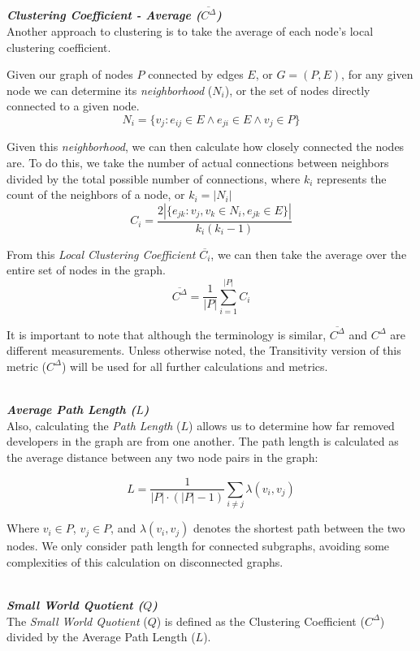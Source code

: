 \documentclass{proc}
\begin{document}
\noindent\\\textit{\textbf{Clustering Coefficient - Average ($\overline{C^\Delta}$)}}\\
Another approach to clustering is to take the average of each node's local clustering coefficient\cite{watts1998collective}.

Given our graph of nodes $P$ connected by edges $E$, or ${G=(P,E)}$, for any given node we can determine its \textit{neighborhood} ($N_i$), or the set of nodes directly connected to a given node.
\[ N_i = \{v_j : e_{ij} \in E \wedge e_{ji} \in E \wedge v_j \in P\} \]

Given this \textit{neighborhood}, we can then calculate how closely connected the nodes are. To do this, we take the number of actual connections between neighbors divided by the total possible number of connections, where $k_i$ represents the count of the neighbors of a node, or {$k_i = |N_i|$}
\[ C_i = \frac{2|\{e_{jk}: v_j,v_k \in N_i, e_{jk} \in E\}|}{k_i(k_i-1)} \]

From this \textit{Local Clustering Coefficient} $\overline{C_i}$, we can then take the average over the entire set of nodes in the graph.
\[ \overline{C^\Delta} = \frac{1}{|P|}\sum^{|P|}_{i=1}C_i \]

It is important to note that although the terminology is similar\cite{uzzi2005collaboration}, $\overline{C^\Delta}$ and $C^\Delta$ are different measurements. Unless otherwise noted, the Transitivity version of this metric ($C^\Delta$) will be used for all further calculations and metrics.

\noindent\\\textit{\textbf{Average Path Length ($L$)}}\\
Also, calculating the \textit{Path Length} ($L$) allows us to determine how far removed developers in the graph are from one another. The path length is calculated as the average distance between any two node pairs in the graph:

\[L = \frac{1}{|P| \cdot (|P|-1)} \sum_{i \neq j}\lambda(v_i,v_j)\]

Where {$v_i \in P$}, {$v_j \in P$}, and {$\lambda(v_i,v_j)$} denotes the shortest path between the two nodes. We only consider path length for connected subgraphs, avoiding some complexities of this calculation on disconnected graphs\cite{boccaletti2006complex}.

\noindent\\\textit{\textbf{Small World Quotient ($Q$)}}\\
The \textit{Small World Quotient} ($Q$) is defined as the Clustering Coefficient ($C^\Delta$) divided by the  Average Path Length ($L$)\cite{watts1999small,watts1998collective}.
\end{document}
